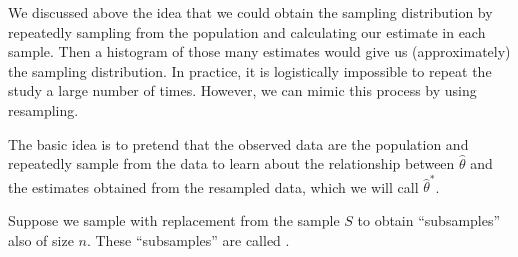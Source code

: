 \documentclass[letterpaper,10pt,english]{jupyterBook}
\begin{document}
\sphinxAtStartPar
We discussed above the idea that we could obtain the sampling distribution by repeatedly sampling from the population and calculating our estimate in each sample. Then a histogram of those many estimates would give us (approximately) the sampling distribution. In practice, it is logistically impossible to repeat the study a large number of times. However, we can mimic this process by using resampling.

\sphinxAtStartPar
The basic idea is to pretend that the observed data are the population and repeatedly sample from the data to learn about the relationship between \(\hat{\theta}\) and the estimates obtained from the re\sphinxhyphen{}sampled data, which we will call \(\hat{\theta}^*\).

\sphinxAtStartPar
Suppose we sample with replacement from the sample \(S\) to obtain “sub\sphinxhyphen{}samples” also of size \(n\). These “sub\sphinxhyphen{}samples” are called .
\end{document}
